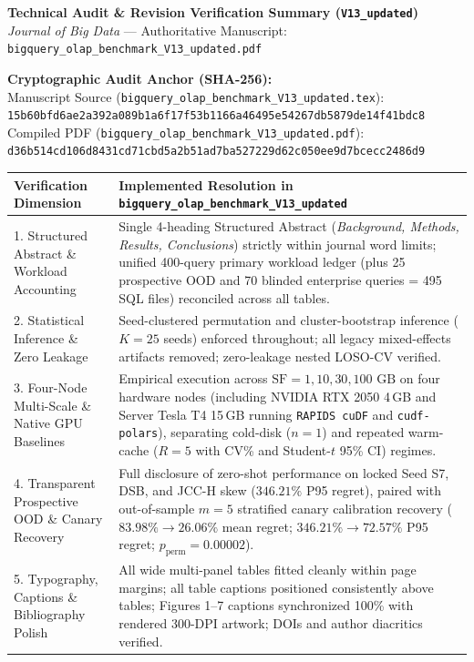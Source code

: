 \documentclass[11pt,a4paper]{article}
\begin{document}
\begin{center}
{\LARGE \textbf{Technical Audit \& Revision Verification Summary (\texttt{V13\_updated})}}\\[0.4em]
\textit{Journal of Big Data} --- Authoritative Manuscript: \texttt{bigquery\_olap\_benchmark\_V13\_updated.pdf}
\end{center}

\textbf{Cryptographic Audit Anchor (SHA-256):}\\
{\footnotesize Manuscript Source (\texttt{bigquery\_olap\_benchmark\_V13\_updated.tex}): \texttt{15b60bfd6ae2a392a089b1a6f17f53b1166a46495e54267db5879de14f41bdc8}}\\
{\footnotesize Compiled PDF (\texttt{bigquery\_olap\_benchmark\_V13\_updated.pdf}): \texttt{d36b514cd106d8431cd71cbd5a2b51ad7ba527229d62c050ee9d7bcecc2486d9}}

\vspace{0.5em}
\renewcommand{\arraystretch}{1.35}
\begin{tabular}{@{}p{}p{}@{}}
\toprule
\textbf{Verification Dimension} & \textbf{Implemented Resolution in \texttt{bigquery\_olap\_benchmark\_V13\_updated}} \\
\midrule
1. Structured Abstract \& Workload Accounting & Single 4-heading Structured Abstract (\textit{Background, Methods, Results, Conclusions}) strictly within journal word limits; unified 400-query primary workload ledger (plus 25 prospective OOD and 70 blinded enterprise queries = 495 SQL files) reconciled across all tables. \\
2. Statistical Inference \& Zero Leakage & Seed-clustered permutation and cluster-bootstrap inference ($K=25$ seeds) enforced throughout; all legacy mixed-effects artifacts removed; zero-leakage nested LOSO-CV verified. \\
3. Four-Node Multi-Scale \& Native GPU Baselines & Empirical execution across $\mathrm{SF}=1, 10, 30, 100\text{ GB}$ on four hardware nodes (including NVIDIA RTX 2050 4\,GB and Server Tesla T4 15\,GB running \texttt{RAPIDS cuDF} and \texttt{cudf-polars}), separating cold-disk ($n=1$) and repeated warm-cache ($R=5$ with CV\% and Student-$t$ 95\% CI) regimes. \\
4. Transparent Prospective OOD \& Canary Recovery & Full disclosure of zero-shot performance on locked Seed S7, DSB, and JCC-H skew ($346.21\%$ P95 regret), paired with out-of-sample $m=5$ stratified canary calibration recovery ($83.98\% \rightarrow 26.06\%$ mean regret; $346.21\% \rightarrow 72.57\%$ P95 regret; $p_{\mathrm{perm}}=0.00002$). \\
5. Typography, Captions \& Bibliography Polish & All wide multi-panel tables fitted cleanly within page margins; all table captions positioned consistently above tables; Figures 1--7 captions synchronized 100\% with rendered 300-DPI artwork; DOIs and author diacritics verified. \\
\bottomrule
\end{tabular}
\end{document}
